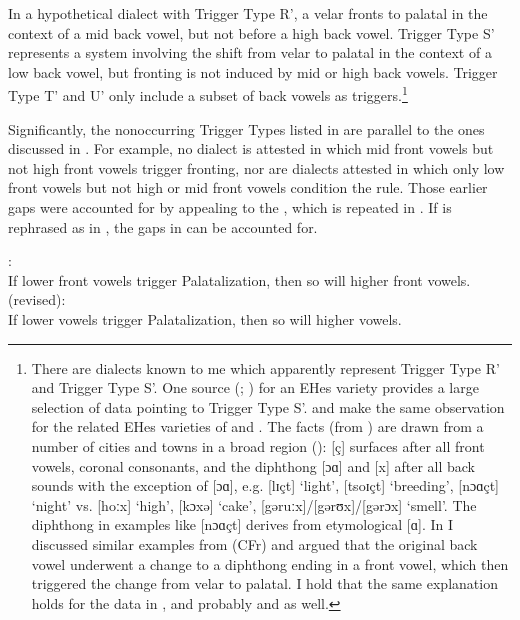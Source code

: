 In a hypothetical dialect with Trigger Type R{}', a velar fronts to palatal in the context of a mid back vowel, but not before a high back vowel. Trigger Type S{}' represents a system involving the shift from velar to palatal in the context of a low back vowel, but fronting is not induced by mid or high back vowels. Trigger Type T{}' and U{}' only include a subset of back vowels as triggers.{\footnote{There are dialects known to me which apparently represent Trigger Type R{}' and Trigger Type S{}'. One source (\citealt{Weber1959}; ) for an EHes variety provides a large selection of data pointing to Trigger Type S{}'. \citet{Krafft1969} and \citet[29]{Post1985} make the same observation for the related EHes varieties of  and . The facts (from \citealt{Weber1959}) are drawn from a number of cities and towns in a broad region (): [ç] surfaces after all front vowels, coronal consonants, and the diphthong [ɔɑ] and [x] after all back sounds with the exception of [ɔɑ], e.g. [lɪçt] ‘light’, [tsoɪçt] ‘breeding’, [nɔɑçt] ‘night’ vs. [hoːx] ‘high’, [kɔxə] ‘cake’, [gəruːx]/[gərʊx]/[gərɔx] ‘smell’. The diphthong in examples like [nɔɑçt] derives from etymological [ɑ]. In  I discussed similar examples from  (CFr) and argued that the original back vowel underwent a change to a diphthong ending in a front vowel, which then triggered the change from velar to palatal. I hold that the same explanation holds for the data in \citet{Weber1959}, and probably \citet{Krafft1969} and \citet{Post1985} as well.}}

Significantly, the nonoccurring Trigger Types listed in  are parallel to the ones discussed in . For example, no dialect is attested in which mid front vowels but not high front vowels trigger fronting, nor are dialects attested in which only low front vowels but not high or mid front vowels condition the rule. Those earlier gaps were accounted for by appealing to the , which is repeated in . If  is rephrased as in , the gaps in  can be accounted for.

\eanoraggedright%
\label{ex:14:49}
  \textsc{}:\\
  If lower front vowels trigger Palatalization, then so will higher front vowels.
\ex%
\label{ex:14:50}
  \textsc{} (revised):\\
  If lower vowels trigger Palatalization, then so will higher vowels.
\z 


